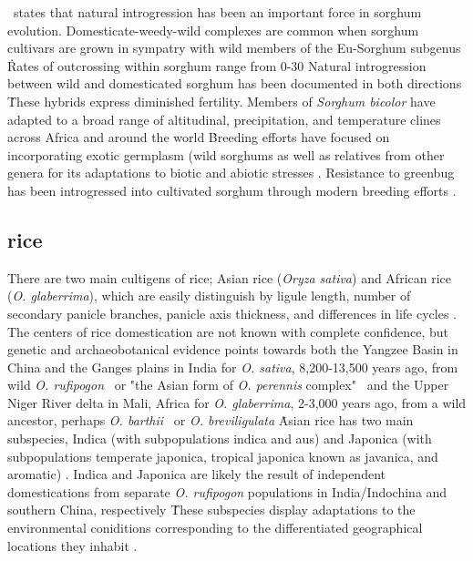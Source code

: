 \documentclass[11pt]{article}
\begin{document}
\cite{po1982sorghum}\ states that natural introgression has been an important force in sorghum evolution.
Domesticate-weedy-wild complexes are common when sorghum cultivars are grown in sympatry with wild members of the Eu-Sorghum subgenus \cite{de1978systematics, doggett1968disruptive, baker1972human}\.
Rates of outcrossing within sorghum range from 0-30%
Natural introgression between wild and domesticated sorghum has been documented in both directions \cite{kuhlman2006interspecific, aldrich1992restriction, aldrich1992patterns, doggett1988sorghum, baker1972migrations}\.
These hybrids express diminished fertility.
Members of \emph{Sorghum bicolor} have adapted to a broad range of altitudinal, precipitation, and temperature clines across Africa and around the world \cite{po1982sorghum, CWR}\.
Breeding efforts have focused on incorporating exotic germplasm (wild sorghums as well as relatives from other genera \cite{de1976cytogenetics} for its adaptations to biotic and abiotic stresses \cite{reddy2006current, po1982sorghum, johnson1979breeding}.
Resistance to greenbug has been introgressed into cultivated sorghum through modern breeding efforts \cite{johnson1979breeding}.









\subsection*{rice}

There are two main cultigens of rice; Asian rice (\emph{Oryza sativa}) and African rice (\emph{O. glaberrima}), which are easily distinguish by ligule length, number of secondary panicle branches, panicle axis thickness, and differences in life cycles \cite{oka2012origin}.
The centers of rice domestication are not known with complete confidence, but genetic and archaeobotanical evidence points towards both the Yangzee Basin in China and the Ganges plains in India for \emph{O. sativa}, 8,200-13,500 years ago, from wild \emph{O. rufipogon}  \cite{oka2012origin, fuller2010consilience, ricepedia, molina2011molecular}\ or "the Asian form of \emph{O. perennis} complex" \cite{oka2012origin}\ and the Upper Niger River delta in Mali, Africa for \emph{O. glaberrima}, 2-3,000 years ago, from a wild ancestor, perhaps \emph{O. barthii} \cite{ricepedia}\ or \emph{O. breviligulata} \cite{oka2012origin}\.
Asian rice has two main subspecies, Indica (with subpopulations indica and aus) and Japonica (with subpopulations temperate japonica, tropical japonica known as javanica, and aromatic) \cite{chang2003origin, glaszmann1987isozymes, ricepedia}.
Indica and Japonica are likely the result of independent domestications from separate \emph{O. rufipogon} populations in India/Indochina and southern China, respectively \cite{londo2006phylogeography}\.
These subspecies display adaptations to the environmental coniditions corresponding to the differentiated geographical locations they inhabit \cite{khush2003classifying}.
\end{document}
